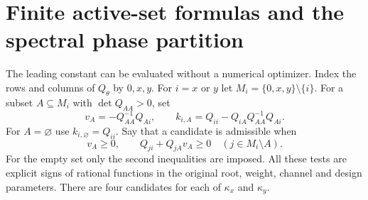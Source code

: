 \section{Finite active-set formulas and the spectral phase partition}
\label{sec:active-v96}
The leading constant can be evaluated without a numerical optimizer.
Index the rows and columns of $Q_\theta$ by $0,x,y$. For $i=x$ or $y$
let $M_i=\{0,x,y\}\setminus\{i\}$. For a subset $A\subseteq M_i$
with $\det Q_{AA}>0$, set
\begin{equation}\label{eq:candidate-v96}
 v_A=-Q_{AA}^{-1}Q_{Ai},\qquad
 k_{i,A}=Q_{ii}-Q_{iA}Q_{AA}^{-1}Q_{Ai}.
\end{equation}
For $A=\varnothing$ use $k_{i,\varnothing}=Q_{ii}$. Say that a
candidate is admissible when
\begin{equation}\label{eq:KKT-v96}
 v_A\ge0,\qquad
 Q_{ji}+Q_{jA}v_A\ge0\quad(j\in M_i\setminus A).
\end{equation}
For the empty set only the second inequalities are imposed.
All these tests are explicit signs of rational functions in the original
root, weight, channel and design parameters. There are four candidates
for each of $\kappa_x$ and $\kappa_y$.

